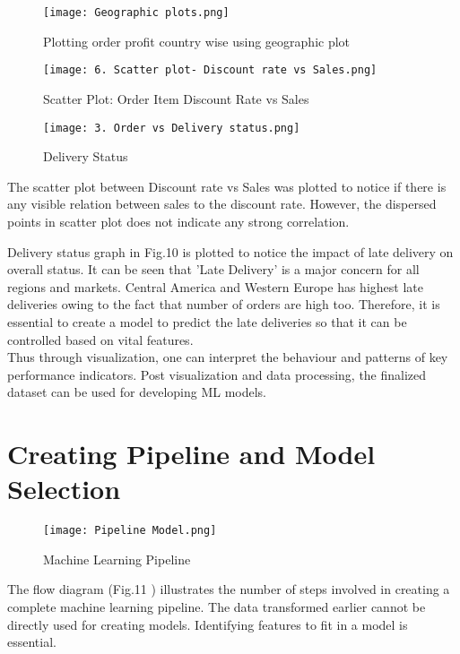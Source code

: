 \documentclass[journal,twoside,web]{ieeecolor}
\begin{document}
\begin{figure}[htbp]
\centerline{\texttt{[image: Geographic plots.png]}}
\caption{Plotting order profit country wise using geographic plot}
\label{fig8 }
\end{figure}

\begin{figure}[htbp]
\centerline{\texttt{[image: 6. Scatter plot- Discount rate vs Sales.png]}}
\caption{Scatter Plot: Order Item Discount Rate vs Sales}
\label{fig9 }
\end{figure}

\begin{figure}[htbp]
\centerline{\texttt{[image: 3. Order vs Delivery status.png]}}
\caption{Delivery Status}
\label{fig10 }
\end{figure}

The scatter plot between Discount rate vs Sales was plotted to notice if there is any visible relation between sales to the discount rate. However, the dispersed points in scatter plot does not indicate any strong correlation. 

Delivery status graph in Fig.10 is plotted to notice the impact of late delivery on overall status. It can be seen that 'Late Delivery' is a major concern for all regions and markets. Central America and Western Europe has highest late deliveries owing to the fact that number of orders are high too. Therefore, it is essential to create a model to predict the late deliveries so that it can be controlled based on vital features. \\





Thus through visualization, one can interpret the behaviour and patterns of key performance indicators. Post visualization and data processing, the finalized dataset can be used for developing ML models.


\section{Creating Pipeline and Model Selection}
\begin{figure}[htbp]
\centerline{\texttt{[image: Pipeline Model.png]}}
\caption{Machine Learning Pipeline}
\label{fig11 }
\end{figure}


The flow diagram (Fig.11 ) illustrates the number of steps involved in creating a complete machine learning pipeline. The data transformed earlier cannot be directly used for creating models. Identifying features to fit in a model is essential.
\end{document}
